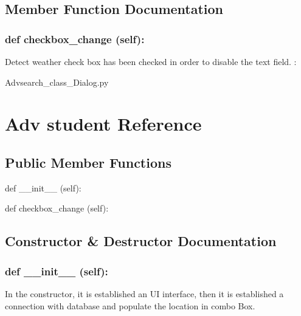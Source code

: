 \subsection{Member Function Documentation}
\hypertarget{class_poly_a14a7ad77ce612b0c54f531d307ee4b39}{
\subsubsection[{def checkbox_change (self):}]{\setlength{\rightskip}{0pt plus 5cm}def {checkbox\_change} (self):}}\label{class_poly_a14a7ad77ce612b0c54f531d307ee4b39}
Detect weather check box has been checked in order to disable the text field.
:\begin{DoxyCompactItemize}
\item 
Advsearch\_class\_Dialog.\-py\end{DoxyCompactItemize}



\hypertarget{Adv_student}{\section{Adv student Reference}
\label{Adv_student}
}
\subsection*{Public Member Functions}
\begin{DoxyCompactItemize}
\item 
def {\_\_init\_\_} (self):
\item 
def {checkbox\_change} (self):

\end{DoxyCompactItemize}

\subsection{Constructor \& Destructor Documentation}
\hypertarget{class_poly_aa3def076b74bed67904976ad4f9fe9b1}{
\subsubsection[{def __init__ (self):}]{\setlength{\rightskip}{0pt plus 5cm}def {\_\_init\_\_} (self): 
}}
In the constructor, it is established an UI interface, then it is  established a connection with database and populate the location in combo Box.
 

